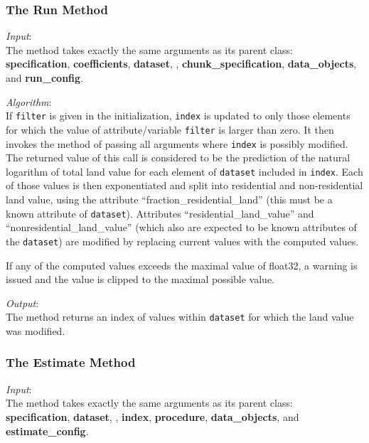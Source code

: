 \subsubsection{The Run Method}
%
{\it Input}:\\[1mm]
The  method takes exactly the same arguments as its parent
class:\\
{\bf specification}, {\bf coefficients}, {\bf dataset}, , {\bf
  chunk_specification}, {\bf data_objects}, and {\bf run_config}.



{\it Algorithm}:\\[1mm]
If \verb|filter| is given in the initialization, \verb|index| is
updated to only those elements for which the value of
attribute/variable \attributesindex\variablesindex \verb|filter| is
larger than zero. It then invokes the  method of
 \modelsindex passing all arguments where
\verb|index| is possibly modified. The returned value of this call
is considered to be the prediction of the natural logarithm of total
land value for each element of \verb|dataset| included in
\verb|index|. Each of those values is then exponentiated and split
into residential and non-residential land value, using the attribute
\attributesindex ``fraction_residential_land'' (this must be a known
attribute \attributesindex of \verb|dataset|). \datasetindex
Attributes \attributesindex ``residential_land_value'' and
``nonresidential_land_value'' (which also are expected to be known
attributes \attributesindex of the \verb|dataset|) are modified by
replacing current values with the computed values.

If any of the computed values exceeds the maximal value of float32, a warning
is issued and the value is clipped to the maximal possible value.

{\it Output}:\\[1mm]
The method returns an index of values within \verb|dataset| \datasetindex for which the land
value was modified.

\subsubsection{The Estimate Method}
{\it Input}:\\[1mm]
The  method takes exactly the same arguments as its parent
class: \\
{\bf specification}, {\bf dataset}, , {\bf index}, {\bf
  procedure}, {\bf data_objects}, and {\bf estimate_config}.

